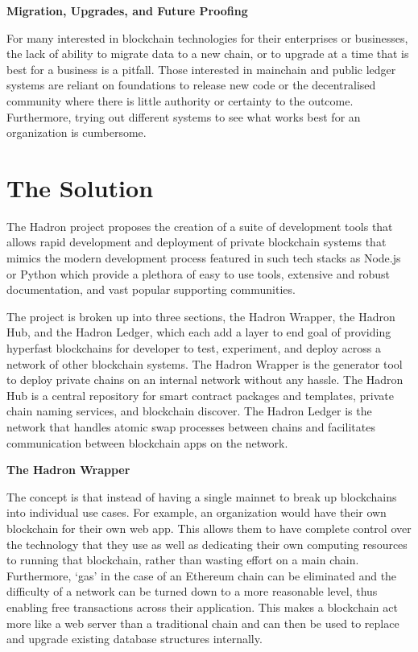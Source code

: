 \documentclass{article}
\begin{document}
\begin{center}
\textbf{Migration, Upgrades, and Future Proofing}
\end{center}

For many interested in blockchain technologies for their enterprises or businesses, the lack of ability to migrate data to a new chain, or to upgrade at a time that is best for a business is a pitfall. Those interested in mainchain and public ledger systems are reliant on foundations to release new code or the decentralised community where there is little authority or certainty to the outcome. Furthermore, trying out different systems to see what works best for an organization is cumbersome.

\section{The Solution}

The Hadron project proposes the creation of a suite of development tools that allows rapid development and deployment of private blockchain systems that mimics the modern development process featured in such tech stacks as Node.js or Python which provide a plethora of easy to use tools, extensive and robust documentation, and vast popular supporting communities.

The project is broken up into three sections, the Hadron Wrapper, the Hadron Hub, and the Hadron Ledger, which each add a layer to end goal of providing hyperfast blockchains for developer to test, experiment, and deploy across a network of other blockchain systems. The Hadron Wrapper is the generator tool to deploy private chains on an internal network without any hassle. The Hadron Hub is a central repository for smart contract packages and templates, private chain naming services, and blockchain discover. The Hadron Ledger is the network that handles atomic swap processes between chains and facilitates communication between blockchain apps on the network.

\begin{center}
\textbf{The Hadron Wrapper}
\end{center}

The concept is that instead of having a single mainnet to break up blockchains into individual use cases. For example, an organization would have their own blockchain for their own web app. This allows them to have complete control over the technology that they use as well as dedicating their own computing resources to running that blockchain, rather than wasting effort on a main chain. Furthermore, ‘gas’ in the case of an Ethereum chain can be eliminated and the difficulty of a network can be turned down to a more reasonable level, thus enabling free transactions across their application. This makes a blockchain act more like a web server than a traditional chain and can then be used to replace and upgrade existing database structures internally.
\end{document}

